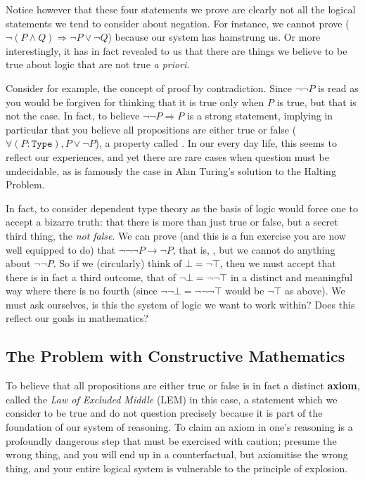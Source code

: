 \documentclass[11pt]{article}
\begin{document}
Notice however that these four statements we prove are clearly not all the logical statements we tend to consider about negation. For instance, we cannot prove  ($\neg (P \wedge Q) \Rightarrow \neg P \vee \neg Q$) because our system has hamstrung us. Or more interestingly, it has in fact revealed to us that there are things we believe to be true about logic that are not true \emph{a priori}.

Consider for example, the concept of proof by contradiction. Since $\neg \neg P$ is read as  you would be forgiven for thinking that it is true only when $P$ is true, but that is not the case. In fact, to believe $\neg \neg P \Rightarrow P$ is a strong statement, implying in particular that you believe all propositions are either true or false ($\forall (P \colon \mathtt{Type}), P \vee \neg P$), a property called . In our every day life, this seems to reflect our experiences, and yet there are rare cases when question must be undecidable, as is famously the case in Alan Turing's solution to the Halting Problem.

In fact, to consider dependent type theory as the basis of logic would force one to accept a bizarre truth: that there is more than just true or false, but a secret third thing, the \emph{not false}. We can prove (and this is a fun exercise you are now well equipped to do) that $\neg \neg \neg P \to \neg P$, that is, , but we cannot do anything about $\neg \neg P$. So if we (circularly) think of $\bot = \neg \top$, then we must accept that there is in fact a third outcome, that of $\neg \bot = \neg \neg \top$ in a distinct and meaningful way where there is no fourth (since $\neg \neg \bot = \neg \neg \neg \top$ would be $\neg \top$ as above). We must ask ourselves, is this the system of logic we want to work within? Does this reflect our goals in mathematics?

\subsection{The Problem with Constructive Mathematics}

To believe that all propositions are either true or false is in fact a distinct \textbf{axiom}, called the \emph{Law of Excluded Middle} (LEM) in this case, a statement which we consider to be true and do not question precisely because it is part of the foundation of our system of reasoning. To claim an axiom in one's reasoning is a profoundly dangerous step that must be exercised with caution; presume the wrong thing, and you will end up in a counterfactual, but axiomitise the wrong thing, and your entire logical system is vulnerable to the principle of explosion.
\end{document}
